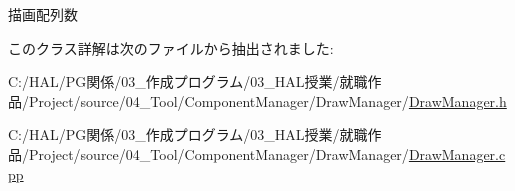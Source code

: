 描画配列数 



このクラス詳解は次のファイルから抽出されました\+:\begin{DoxyCompactItemize}
\item 
C\+:/\+H\+A\+L/\+P\+G関係/03\+\_\+作成プログラム/03\+\_\+\+H\+A\+L授業/就職作品/\+Project/source/04\+\_\+\+Tool/\+Component\+Manager/\+Draw\+Manager/\mbox{\hyperlink{_draw_manager_8h}{Draw\+Manager.\+h}}\item 
C\+:/\+H\+A\+L/\+P\+G関係/03\+\_\+作成プログラム/03\+\_\+\+H\+A\+L授業/就職作品/\+Project/source/04\+\_\+\+Tool/\+Component\+Manager/\+Draw\+Manager/\mbox{\hyperlink{_draw_manager_8cpp}{Draw\+Manager.\+cpp}}\end{DoxyCompactItemize}
